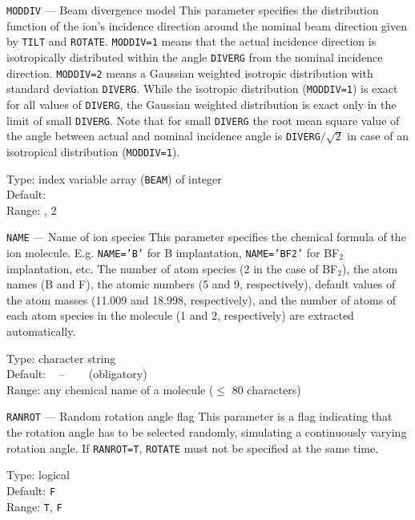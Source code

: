 \begin{keydescription}{\texttt{MODDIV} --- Beam divergence model}
%
  This parameter specifies the distribution function of the ion's
  incidence direction around the nominal beam direction given by
  \texttt{TILT} and \texttt{ROTATE}. \texttt{MODDIV=1} means that the
  actual incidence direction is isotropically distributed within the
  angle \texttt{DIVERG} from the nominal incidence direction.
  \texttt{MODDIV=2} means a Gaussian weighted isotropic distribution 
  with standard deviation \texttt{DIVERG}. While the isotropic distribution 
  (\texttt{MODDIV=1}) is exact for all values of \texttt{DIVERG}, the Gaussian
  weighted distribution is exact only in the limit of small \texttt{DIVERG}.
  Note that for small \texttt{DIVERG} the root mean square value of the angle
  between actual and nominal incidence angle is \texttt{DIVERG}$/\sqrt{2}$ in 
  case of an isotropical distribution (\texttt{MODDIV=1}).
%
  \begin{keytab}
    Type:    \> index variable array (\texttt{BEAM}) of integer \\
    Default:  \\
    Range:   , 2
  \end{keytab}
\end{keydescription}

\begin{keydescription}{\texttt{NAME} --- Name of ion species}
%
  This parameter specifies the chemical formula of the ion molecule.
  E.g. \texttt{NAME='B'} for B implantation, \texttt{NAME='BF2'} for
  BF$_2$ implantation, etc.  The number of atom species (2 in the case
  of BF$_2$), the atom names (B and F), the atomic numbers (5 and 9,
  respectively), default values of the atom masses (11.009 and 18.998,
  respectively), and the number of atoms of each atom species in the
  molecule (1 and 2, respectively) are extracted automatically.
%
  \begin{keytab}
    Type:    \> character string \\
    Default: \> ~ -- ~~~ (obligatory) \\
    Range:   \> any chemical name of a molecule ($\le$ 80 characters)
  \end{keytab}
\end{keydescription}

\begin{keydescription}{\texttt{RANROT} --- Random rotation angle flag}
%
  This parameter is a flag indicating that the rotation angle has to be
  selected randomly, simulating a continuously varying rotation angle.
  If \texttt{RANROT=T}, \texttt{ROTATE} must not be specified at the
  same time.
%
  \begin{keytab}
    Type:    \> logical \\
    Default: \> \texttt{F} \\
    Range:   \> \texttt{T}, \texttt{F}
  \end{keytab}
\end{keydescription}

